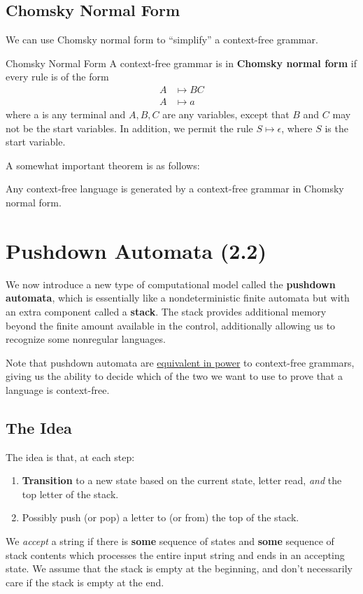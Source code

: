 \documentclass[letterpaper]{article}
\begin{document}
\subsection{Chomsky Normal Form}
We can use Chomsky normal form to ``simplify'' a context-free grammar. 
\begin{definition}{Chomsky Normal Form}{}
    A context-free grammar is in \textbf{Chomsky normal form} if every rule is of the form 
    \begin{equation*}
        \begin{aligned}
            A &\mapsto BC \\ 
            A &\mapsto a
        \end{aligned}
    \end{equation*}
    where a is any terminal and $A, B, C$ are any variables, except that $B$ and $C$ may not be the start variables. In addition, we permit the rule $S \mapsto \epsilon$, where $S$ is the start variable.  
\end{definition}

A somewhat important theorem is as follows:
\begin{theorem}{}{}
    Any context-free language is generated by a context-free grammar in Chomsky normal form. 
\end{theorem}






\newpage 
\section{Pushdown Automata (2.2)}
We now introduce a new type of computational model called the \textbf{pushdown automata}, which is essentially like a nondeterministic finite automata but with an extra component called a \textbf{stack}. The stack provides additional memory beyond the finite amount available in the control, additionally allowing us to recognize some nonregular languages. 

\bigskip 

Note that pushdown automata are \underline{equivalent in power} to context-free grammars, giving us the ability to decide which of the two we want to use to prove that a language is context-free. 


\subsection{The Idea}
The idea is that, at each step: 
\begin{enumerate}
    \item \textbf{Transition} to a new state based on the current state, letter read, \emph{and} the top letter of the stack. 
    \item Possibly push (or pop) a letter to (or from) the top of the stack. 
\end{enumerate}
We \emph{accept} a string if there is \textbf{some} sequence of states and \textbf{some} sequence of stack contents which processes the entire input string and ends in an accepting state. We assume that the stack is empty at the beginning, and don't necessarily care if the stack is empty at the end.
\end{document}

